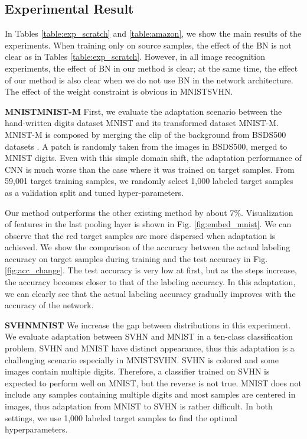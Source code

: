 \documentclass{article}
\begin{document}
\subsection{Experimental Result}
In Tables \ref{table:exp_scratch} and \ref{table:amazon}, we show the main results of the experiments.
When training only on source samples, the effect of the BN is not clear as in Tables \ref{table:exp_scratch}.
However, in all image recognition experiments, the effect of BN in our method is clear; at the same time, the effect of our method is also clear when we do not use BN in the network architecture. The effect of the weight constraint is obvious in MNISTSVHN.

\textbf{MNISTMNIST-M}
First, we evaluate the adaptation scenario between the hand-written digits dataset MNIST and its transformed dataset MNIST-M. MNIST-M is composed by merging the clip of the background from BSDS500 datasets \cite{arbelaez2011contour}. A patch is randomly taken from the images in BSDS500, merged to MNIST digits. Even with this simple domain shift, the adaptation performance of CNN is much worse than the case where it was trained on target samples. From 59,001 target training samples, we randomly select 1,000 labeled target samples as a validation split and tuned hyper-parameters.

Our method outperforms the other existing method by about 7\%. Visualization of features in the last pooling layer is shown in Fig. \ref{fig:embed_mnist}. We can observe that the red target samples are more dispersed when adaptation is achieved. We show the comparison of the accuracy between the actual labeling accuracy on target samples during training and the test accuracy in Fig. \ref{fig:acc_change}. The test accuracy is very low at first, but as the steps increase, the accuracy becomes closer to that of the labeling accuracy. In this adaptation, we can clearly see that the actual labeling accuracy gradually improves with the accuracy of the network.

\textbf{SVHNMNIST}
We increase the gap between distributions in this experiment. We evaluate adaptation between SVHN \cite{netzer2011reading} and MNIST in a ten-class classification problem. SVHN and MNIST have distinct appearance, thus this adaptation is a challenging scenario especially in MNISTSVHN. SVHN is colored and some images contain multiple digits. Therefore, a classifier trained on SVHN is expected to perform well on MNIST, but the reverse is not true. MNIST does not include any samples containing multiple digits and most samples are centered in images, thus adaptation from MNIST to SVHN is rather difficult. In both settings, we use 1,000 labeled target samples to find the optimal hyperparameters.
\end{document}
